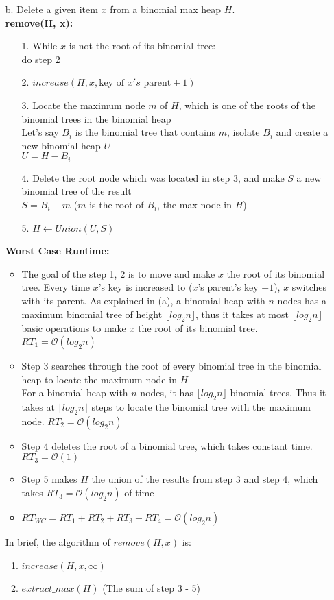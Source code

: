 \documentclass[10pt]{article}
\begin{document}
\begin{enumerate}
\item[b.]Delete a given item $x$ from a binomial max heap $H$.\\
\textbf{remove(H, x):}
\begin{enumerate}
\item[1.]While $x$ is not the root of its binomial tree: \\do step 2
\item[2.]$increase(H, x, \text{key of }x's\text{ parent} + 1)$
\item[3.]Locate the maximum node $m$ of $H$, which is one of the roots of the binomial trees in the binomial heap\\
Let's say $B_i$ is the binomial tree that contains $m$, isolate $B_i$ and create a new binomial heap $U$\\
$U=H-B_i$
\item[4.]Delete the root node which was located in step 3, and make $S$ a new binomial tree of the result\\
$S=B_i-m$ \null\hfill ($m$ is the root of $B_i$, the max node in $H$)
\item[5.]$H\leftarrow Union(U,S)$
\end{enumerate}
\textbf{Worst Case Runtime:}
\begin{itemize}
\item
The goal of the step 1, 2 is to move and make $x$ the root of its binomial tree. Every time $x$'s key is increased to ($x$'s parent's key $+1$), $x$ switches with its parent. As explained in (a), a binomial heap with $n$ nodes has a maximum binomial tree of height $\lfloor log_2n\rfloor$, thus it takes at most $\lfloor log_2n\rfloor$ basic operations to make $x$ the root of its binomial tree. $RT_1=\mathcal{O}(log_2n)$
\item
Step 3 searches through the root of every binomial tree in the binomial heap to locate the maximum node in $H$\\
For a binomial heap with $n$ nodes, it has $\lfloor log_2n\rfloor$ binomial trees. Thus it takes at $\lfloor log_2n\rfloor$ steps to locate the binomial tree with the maximum node. $RT_2=\mathcal{O}(log_2n)$
\item
Step 4 deletes the root of a binomial tree, which takes constant time. $RT_3=\mathcal{O}(1)$
\item 
Step 5 makes $H$ the union of the results from step 3 and step 4, which takes $RT_3=\mathcal{O}(log_2n)$ of time
\item
$RT_{WC} = RT_1 + RT_2 + RT_3 + RT_4 = \mathcal{O}(log_2n)$
\end{itemize}
In brief, the algorithm of $remove(H, x)$ is:
\begin{enumerate}
\item $increase(H,x,\infty)$
\item $extract\_max(H)$ \null\hfill (The sum of step 3 - 5)
\end{enumerate}
\end{enumerate}
\newpage
\end{document}
